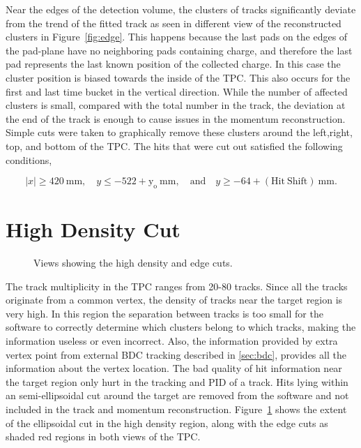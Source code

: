 Near the edges of the detection volume, the clusters of tracks significantly deviate from the trend of the fitted track as seen in different view of the reconstructed clusters in Figure~\ref{fig:edge}.  This happens because the last pads on the edges of the pad-plane have no neighboring pads containing charge, and therefore the last pad represents the last known position of the collected charge. In this case the cluster position is biased towards the inside of the TPC. This also occurs for the first and last time bucket in the vertical direction. While the number of affected clusters is small, compared with the total number in the track, the deviation at the end of the track is enough to cause issues in the momentum reconstruction. Simple cuts were taken to graphically remove these clusters around the left,right, top, and bottom of the TPC. The hits that were cut out satisfied the following conditions, 

\begin{equation*}
  |x|\geq420~\mathrm{mm},\quad y\leq-522+\mathrm{y_o}~\mathrm{mm},
  \quad\mathrm{and}\quad y\geq-64+\mathrm{(Hit\ Shift)}~\mathrm{mm}.
\label{eq:hitshift}
\end{equation*}



\section{High Density Cut}



\begin{figure}[!htb]%
    \centering
    \qquad
 	  \label{fig:highcut}
        \caption{Views showing the high density and edge cuts.}
        \label{fig:elipsecut}
\end{figure}



The track multiplicity in the TPC ranges from 20-80 tracks. Since all the tracks originate from a common vertex, the density of tracks near the target region is very high. In this region the separation between tracks is too small for the software to correctly determine which clusters belong to which tracks, making the information useless or even incorrect. Also, the information provided by extra vertex point from external BDC tracking described in \ref{sec:bdc}, provides all the information about the vertex location. The bad quality of hit information near the target region only hurt in the tracking and PID of a track. Hits lying within an semi-ellipsoidal cut around the target are removed from the software and not included in the track and momentum reconstruction. Figure~\ref{fig:elipsecut} shows the extent of the ellipsoidal cut in the high density region, along with the edge cuts as shaded red regions in both views of the TPC. 

